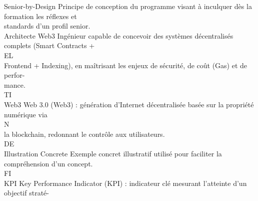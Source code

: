 Senior-by-Design                            Principe de conception du programme visant à inculquer dès la formation les réflexes et\\
standards d’un profil senior.\\
\vspace{0.5em}
Architecte Web3                             Ingénieur capable de concevoir des systèmes décentralisés complets (Smart Contracts +\\
\vspace{0.5em}
\vspace{0.5em}
\vspace{0.5em}
\vspace{0.5em}
EL\\
Frontend + Indexing), en maîtrisant les enjeux de sécurité, de coût (Gas) et de perfor-\\
mance.\\
\vspace{0.5em}
\vspace{0.5em}
\vspace{0.5em}
\vspace{0.5em}
TI\\
Web3                                        Web 3.0 (Web3) : génération d’Internet décentralisée basée sur la propriété numérique via\\
\vspace{0.5em}
\vspace{0.5em}
\vspace{0.5em}
\vspace{0.5em}
N\\
la blockchain, redonnant le contrôle aux utilisateurs.\\
\vspace{0.5em}
\vspace{0.5em}
\vspace{0.5em}
\vspace{0.5em}
DE\\
Illustration Concrete                       Exemple concret illustratif utilisé pour faciliter la compréhension d’un concept.\\
\vspace{0.5em}
\vspace{0.5em}
\vspace{0.5em}
\vspace{0.5em}
FI\\
KPI                                         Key Performance Indicator (KPI) : indicateur clé mesurant l’atteinte d’un objectif straté-\\
\vspace{0.5em}
